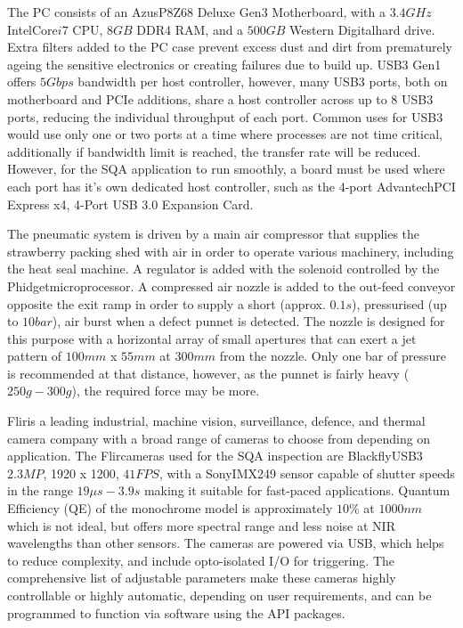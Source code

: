 \documentclass[fleqn,twoside,12pt]{report}
\begin{document}
The PC consists of an Azus\textregistered P8Z68 Deluxe Gen3 Motherboard, with a $3.4GHz$ Intel\textregistered Core\texttrademark $i7$ CPU, $8GB$ DDR4 RAM, and a $500GB$ Western Digital\textregistered hard drive. Extra filters added to the PC case prevent excess dust and dirt from prematurely ageing the sensitive electronics or creating failures due to build up. USB3 Gen1 offers $5Gbps$ bandwidth per host controller, however, many USB3 ports, both on motherboard and PCIe additions, share a host controller across up to 8 USB3 ports, reducing the individual throughput of each port. Common uses for USB3 would use only one or two ports at a time where processes are not time critical, additionally if bandwidth limit is reached, the transfer rate will be reduced. However, for the SQA application to run smoothly, a board must be used where each port has it's own dedicated host controller, such as the 4-port Advantech\texttrademark PCI Express x4, 4-Port USB 3.0 Expansion Card. 

The pneumatic system is driven by a main air compressor that supplies the strawberry packing shed with air in order to operate various machinery, including the heat seal machine. A regulator is added with the solenoid controlled by the Phidget\texttrademark microprocessor. A compressed air nozzle is added to the out-feed conveyor opposite the exit ramp in order to supply a short (approx. $0.1s$), pressurised (up to $10bar$), air burst when a defect punnet is detected. The nozzle is designed for this purpose with a horizontal array of small apertures that can exert a jet pattern of $100mm$ x $55mm$ at $300mm$ from the nozzle. Only one bar of pressure is recommended at that distance, however, as the punnet is fairly heavy ($250g-300g$), the required force may be more.

Flir\textregistered is a leading industrial, machine vision, surveillance, defence, and thermal camera company with a broad range of cameras to choose from depending on application. The Flir\textregistered cameras used for the SQA inspection are Blackfly\textregistered USB3 $2.3 MP$, 1920 x 1200, $41FPS$, with a Sony\textregistered IMX249 sensor capable of shutter speeds in the range $19\mu s-3.9s$ making it suitable for fast-paced applications. Quantum Efficiency (QE) of the monochrome model is approximately $10\%$ at $1000nm$ which is not ideal, but offers more spectral range and less noise at NIR wavelengths than other sensors. The cameras are powered via USB, which helps to reduce complexity, and include opto-isolated I/O for triggering. The comprehensive list of adjustable parameters make these cameras highly controllable or highly automatic, depending on user requirements, and can be programmed to function via software using the API packages. 
\end{document}
